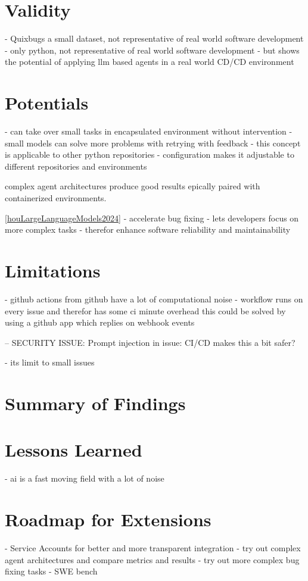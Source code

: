 \section{Validity}
- Quixbugs a small dataset, not representative of real world software development
- only python, not representative of real world software development
- but shows the potential of applying llm based agents in a real world CD/CD environment

\section{Potentials}
- can take over small tasks in encapsulated environment without intervention
- small models can solve more problems with retrying with feedback
- this concept is applicable to other python repositories
- configuration makes it adjustable to different repositories and environments

complex agent architectures produce good results epically paired with containerized environments. \cite{puvvadiCodingAgentsComprehensive2025}

\ref{houLargeLanguageModels2024}
- accelerate bug fixing
- lets developers focus on more complex tasks
- therefor enhance software reliability and maintainability

\section{Limitations}
- github actions from github have a lot of computational noise
- workflow runs on every issue and therefor has some ci minute overhead this could be solved by using a github app which replies on webhook events

-- SECURITY ISSUE: Prompt injection in issue: CI/CD makes this a bit safer?

- its limit to small issues

\section{Summary of Findings}
\section{Lessons Learned}
- ai is a fast moving field with a lot of noise


\section{Roadmap for Extensions}
- Service Accounts for better and more transparent integration
- try out complex agent architectures and compare metrics and results
- try out more complex bug fixing tasks - SWE bench